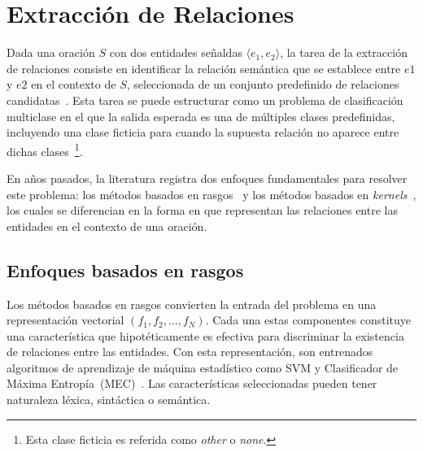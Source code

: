 

\section{Extracción de Relaciones}

Dada una oración $S$ con dos entidades señaldas $\langle e_1,e_2 \rangle$, la tarea de la extracción de relaciones consiste en identificar la relación semántica que se establece entre $e1$ y $e2$ en el contexto de $S$, seleccionada de un conjunto predefinido de relaciones candidatas~\cite{hendrickx2009semeval}.
Esta tarea se puede estructurar como un problema de clasificación multiclase en el que la salida esperada es una de múltiples clases predefinidas, incluyendo una clase ficticia para cuando la supuesta relación no aparece entre dichas clases~\footnote{Esta clase ficticia es referida como \textit{other} o \textit{none}.}.

En años pasados, la literatura registra dos enfoques fundamentales para resolver este problema: los métodos basados en rasgos~\cite{kambhatla2004combining, boschee2005automatic, guodong2005exploring, grishman2005nyu, jiang2007systematic, chan2010exploiting, rink2010utd, sun2011semi, rink2010utd, nguyen2014employing} y los métodos basados en \textit{kernels}~\cite{zelenko2003kernel, culotta2004dependency, bunescu2005shortest, qian2008exploiting, nguyen2009convolution, sun2014feature}, los cuales se diferencian en la forma en que representan las relaciones entre las entidades en el contexto de una oración.

\subsection{Enfoques basados en rasgos}

Los métodos basados en rasgos convierten la entrada del problema en una representación vectorial $(f_1,f_2,\dots,f_N)$.
Cada una estas componentes constituye una característica que hipotéticamente es efectiva para discriminar la existencia de relaciones entre las entidades.
Con esta representación, son entrenados algoritmos de aprendizaje de máquina estadístico como SVM y Clasificador de Máxima Entropía~(MEC)~\cite{maxentropy}.
Las características seleccionadas pueden tener naturaleza léxica, sintáctica o semántica.

